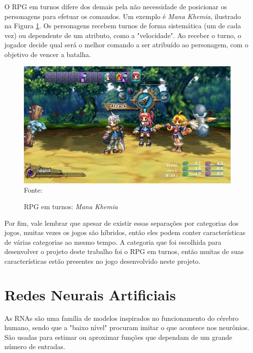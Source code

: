 \documentclass[
	12pt,					%
	openright,				%
	oneside,				%
	a4paper,				%
	bibjustif,				%
	chapter=TITLE,			%
	english,				%
	brazil,					%
	]{abntex2}
\newcommand{\source}[1]{\small Fonte: {#1}}
\begin{document}
		O RPG em turnos difere dos demais pela não necessidade de posicionar os personagens para efetuar os comandos.
		Um exemplo é \textit{Mana Khemia}, ilustrado na Figura \ref{fig:manaKhemia}.
		Os personagens recebem turnos de forma sistemática
		(um de cada vez)
		ou dependente de um atributo,
		 como a "velocidade".
		Ao receber o turno, o jogador decide qual será o melhor comando a ser atribuído ao personagem,
		com o objetivo de vencer a batalha.
		
		\begin{figure}[ht!]
			\caption{RPG em turnos: \textit{Mana Khemia}}
			\centering
			\includegraphics[scale=0.55]{img/mana-khemia.jpg}\\
			\vspace{0.5mm}
			\source{}
			\label{fig:manaKhemia}
		\end{figure}
		
		Por fim, vale lembrar que apesar de existir essas separações por categorias dos jogos,
		muitas vezes os jogos são híbridos,
		então eles podem conter características de várias categorias ao mesmo tempo.
		A categoria que foi escolhida para desenvolver o projeto deste trabalho foi o RPG em turnos,
		então muitas de suas características estão presentes no jogo desenvolvido neste projeto.
		

	\FloatBarrier
	\section{Redes Neurais Artificiais}
	As RNAs são uma família de modelos inspirados no funcionamento do cérebro humano,
	sendo que a "baixo nível"{} procuram imitar o que acontece nos neurônios.
	São usadas para estimar ou aproximar funções que dependam de um grande número de entradas.
	
\end{document}
